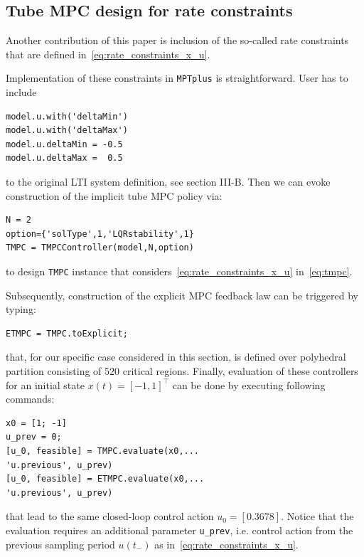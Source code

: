 \documentclass[letterpaper, 10 pt, conference]{ieeeconf}
\begin{document}


\subsection{Tube MPC design for rate constraints}
\label{sec:mptplus_tube_mpc_delta_u}

Another contribution of this paper is inclusion of the so-called rate constraints that are defined in~\eqref{eq:rate_constraints_x_u}.

Implementation of these constraints in \texttt{MPTplus} is straightforward. User has to include 
\begin{verbatim}
model.u.with('deltaMin')
model.u.with('deltaMax')
model.u.deltaMin = -0.5
model.u.deltaMax =  0.5
\end{verbatim}
to the original LTI system definition, see section III-B. Then we can evoke construction of the implicit tube MPC policy via:
\begin{verbatim}
N = 2
option={'solType',1,'LQRstability',1}
TMPC = TMPCController(model,N,option)
\end{verbatim}
to design \texttt{TMPC} instance that considers~\eqref{eq:rate_constraints_x_u} in~\eqref{eq:tmpc}.

Subsequently, construction of the explicit MPC feedback law can be triggered by typing:
\begin{verbatim}
ETMPC = TMPC.toExplicit;
\end{verbatim}
that, for our specific case considered in this section, is defined over polyhedral partition consisting of $520$ critical regions.
Finally, evaluation of these controllers for an initial state $x(t) = [-1, 1]^\top$ can be done by executing following commands:
\begin{verbatim}
x0 = [1; -1]
u_prev = 0;
[u_0, feasible] = TMPC.evaluate(x0,...
'u.previous', u_prev)
[u_0, feasible] = ETMPC.evaluate(x0,...
'u.previous', u_prev)
\end{verbatim}
that lead to the same closed-loop control action $u_0 = [0.3678]$.
Notice that the evaluation requires an additional parameter \verb|u_prev|, i.e. control action from the previous sampling period $u(t_{-})$ as in~\eqref{eq:rate_constraints_x_u}.
\end{document}
